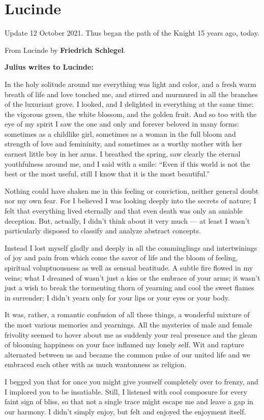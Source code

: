 \section{Lucinde}%
\label{sec:Lucinde}
\begin{quotex}
Update 12 October 2021. Thus began the path of the Knight 15 years ago, today.

\end{quotex}
From Lucinde by \textbf{Friedrich Schlegel}.

\textbf{Julius writes to Lucinde:}

\begin{quotex}
In the holy solitude around me everything was light and color, and a fresh warm breath of life and love touched me, and stirred and murmured in all the branches of the luxuriant grove. I looked, and I delighted in everything at the same time: the vigorous green, the white blossom, and the golden fruit. And so too with the eye of my spirit I saw the one and only and forever beloved in many forms: sometimes as a childlike girl, sometimes as a woman in the full bloom and strength of love and femininity, and sometimes as a worthy mother with her earnest little boy in her arms. I breathed the spring, saw clearly the eternal youthfulness around me, and I said with a smile: “Even if this world is not the best or the most useful, still I know that it is the most beautiful.”

Nothing could have shaken me in this feeling or conviction, neither general doubt nor my own fear. For I believed I was looking deeply into the secrets of nature; I felt that everything lived eternally and that even death was only an amiable deception. But, actually, I didn't think about it very much — at least I wasn't particularly disposed to classify and analyze abstract concepts.

Instead I lost myself gladly and deeply in all the comminglings and intertwinings of joy and pain from which come the savor of life and the bloom of feeling, spiritual voluptuousness as well as sensual beatitude. A subtle fire flowed in my veins; what I dreamed of wasn't just a kiss or the embrace of your arms; it wasn't just a wish to break the tormenting thorn of yearning and cool the sweet flames in surrender; I didn't yearn only for your lips or your eyes or your body.

It was, rather, a romantic confusion of all these things, a wonderful mixture of the most various memories and yearnings. All the mysteries of male and female frivolity seemed to hover about me as suddenly your real presence and the gleam of blooming happiness on your face inflamed my lonely self. Wit and rapture alternated between us and became the common pulse of our united life and we embraced each other with as much wantonness as religion.

I begged you that for once you might give yourself completely over to frenzy, and I implored you to be insatiable. Still, I listened with cool composure for every faint sign of bliss, so that not a single trace might escape me and leave a gap in our harmony. I didn't simply enjoy, but felt and enjoyed the enjoyment itself.

\end{quotex}

